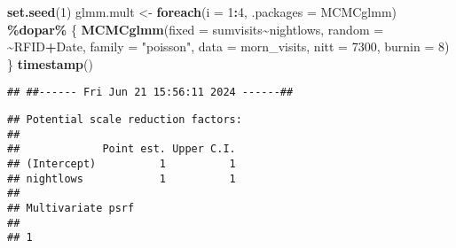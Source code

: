 \documentclass[
]{article}
\newenvironment{Shaded}{\begin{snugshade}}{\end{snugshade}}
\newcommand{\AttributeTok}[1]{\textcolor[rgb]{0.13,0.29,0.53}{#1}}
\newcommand{\CommentTok}[1]{\textcolor[rgb]{0.56,0.35,0.01}{\textit{#1}}}
\newcommand{\ControlFlowTok}[1]{\textcolor[rgb]{0.13,0.29,0.53}{\textbf{#1}}}
\newcommand{\DecValTok}[1]{\textcolor[rgb]{0.00,0.00,0.81}{#1}}
\newcommand{\DocumentationTok}[1]{\textcolor[rgb]{0.56,0.35,0.01}{\textbf{\textit{#1}}}}
\newcommand{\FloatTok}[1]{\textcolor[rgb]{0.00,0.00,0.81}{#1}}
\newcommand{\FunctionTok}[1]{\textcolor[rgb]{0.13,0.29,0.53}{\textbf{#1}}}
\newcommand{\NormalTok}[1]{#1}
\newcommand{\OtherTok}[1]{\textcolor[rgb]{0.56,0.35,0.01}{#1}}
\newcommand{\SpecialCharTok}[1]{\textcolor[rgb]{0.81,0.36,0.00}{\textbf{#1}}}
\newcommand{\StringTok}[1]{\textcolor[rgb]{0.31,0.60,0.02}{#1}}
\begin{document}
\begin{Shaded}
\begin{Highlighting}[]
\FunctionTok{set.seed}\NormalTok{(}\DecValTok{1}\NormalTok{)}
\NormalTok{glmm.mult }\OtherTok{\textless{}{-}} \FunctionTok{foreach}\NormalTok{(}\AttributeTok{i =} \DecValTok{1}\SpecialCharTok{:}\DecValTok{4}\NormalTok{, }\AttributeTok{.packages =} \StringTok{\textquotesingle{}MCMCglmm\textquotesingle{}}\NormalTok{) }\SpecialCharTok{\%dopar\%}\NormalTok{ \{}
    \FunctionTok{MCMCglmm}\NormalTok{(}\AttributeTok{fixed =}\NormalTok{ sumvisits}\SpecialCharTok{\textasciitilde{}}\NormalTok{nightlows,}
             \AttributeTok{random =} \SpecialCharTok{\textasciitilde{}}\NormalTok{RFID}\SpecialCharTok{+}\NormalTok{Date,}
             \AttributeTok{family =} \StringTok{"poisson"}\NormalTok{,}
             \AttributeTok{data =}\NormalTok{ morn\_visits, }
             \AttributeTok{nitt =} \DecValTok{7300}\NormalTok{, }
             \AttributeTok{burnin =} \DecValTok{8}\NormalTok{)}
\NormalTok{\}}
\FunctionTok{timestamp}\NormalTok{()}
\end{Highlighting}
\end{Shaded}

\begin{verbatim}
## ##------ Fri Jun 21 15:56:11 2024 ------##
\end{verbatim}

\begin{Shaded}
\end{Shaded}

\begin{verbatim}
## Potential scale reduction factors:
## 
##             Point est. Upper C.I.
## (Intercept)          1          1
## nightlows            1          1
## 
## Multivariate psrf
## 
## 1
\end{verbatim}
\end{document}
